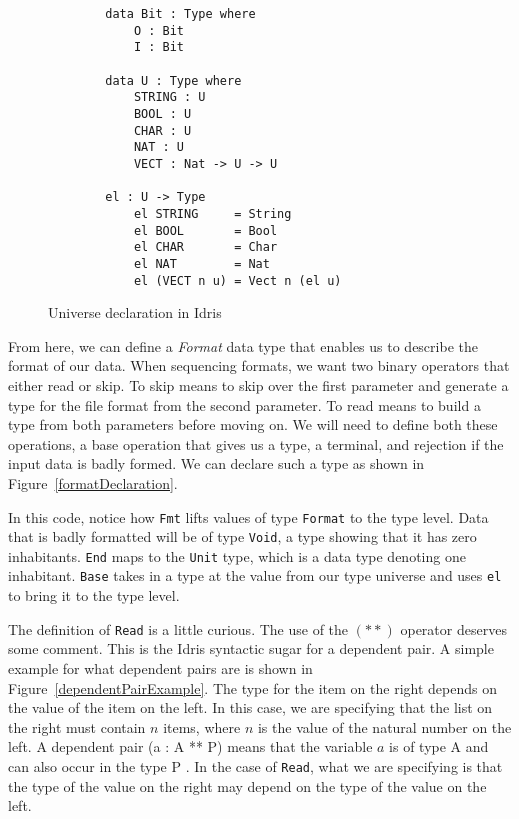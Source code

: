 \begin{figure}[h]
    \caption{Universe declaration in Idris \protect\cite{power_of_pi}}
    \label{universe}
    \begin{lstlisting}
        data Bit : Type where 
            O : Bit 
            I : Bit

        data U : Type where
            STRING : U
            BOOL : U
            CHAR : U
            NAT : U
            VECT : Nat -> U -> U
        
        el : U -> Type
            el STRING     = String
            el BOOL       = Bool
            el CHAR       = Char
            el NAT        = Nat
            el (VECT n u) = Vect n (el u)
    \end{lstlisting}
\end{figure}

From here, we can define a \textit{Format} data type that enables us to describe
the format of our data. When sequencing formats, we want two binary operators
that either read or skip. To skip means to skip over the first parameter and
generate a type for the file format from the second parameter. To read means to
build a type from both parameters before moving on. We will need to define both
these operations, a base operation that gives us a type, a terminal, and
rejection if the input data is badly formed. We can declare such a type as
shown in Figure~\ref{formatDeclaration}. 

In this code, notice how \texttt{Fmt} lifts values of type \texttt{Format} to
the type level. Data that is badly formatted will be of type \texttt{Void}, a
type showing that it has zero inhabitants. \texttt{End} maps to the
\texttt{Unit} type, which is a data type denoting one inhabitant. \texttt{Base}
takes in a type at the value from our type universe and uses \texttt{el} to
bring it to the type level. 

The definition of \texttt{Read} is a little curious. The use of the $(**)$
operator deserves some comment. This is the Idris syntactic sugar for a
dependent pair. A simple example for what dependent pairs are is shown in
Figure~\ref{dependentPairExample}. The type for the item on the right depends on
the value of the item on the left. In this case, we are specifying that the list
on the right must contain $n$ items, where $n$ is the value of the natural
number on the left. A dependent pair (a : A ** P) means that the variable $a$ is
of type A and can also occur in the type P \cite{tdd_book}. In the case of
\texttt{Read}, what we are specifying is that the type of the value on the right
may depend on the type of the value on the left. 

